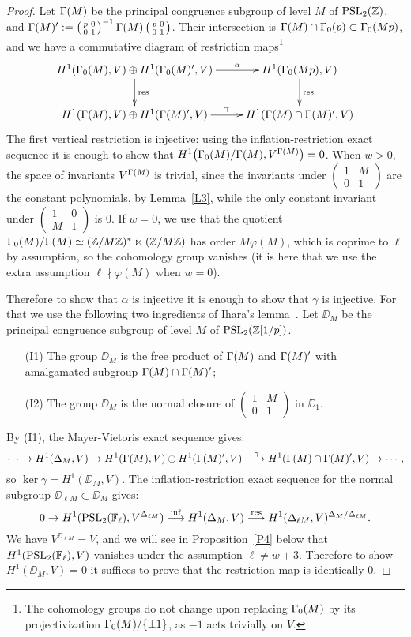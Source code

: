 \documentclass{amsart}
\theoremstyle{plain}
\theoremstyle{definition}
\numberwithin{equation}{section}
\newcommand{\Z}{{\mathbb Z}}
\def\a{\alpha}\def\b{\beta}\def\g{\gamma}
\def\sm#1#2#3#4{\left(\begin{smallmatrix}#1&#2 \\ #3 & #4 \end{smallmatrix}\right)}
\def\vp{\varphi}
\def\rar{\rightarrow}\def\FF{\mathbb{F}}
\begin{document}
\begin{proof}
Let $\Gamma(M)$ be the principal congruence subgroup of level $M$ of
$\PSL_2(\Z)$, and $\G(M)':=\sm p001 ^{-1}
\G(M) \sm p001$. Their intersection is $\Gamma(M)\cap \Gamma_0(p)\subset \Gamma_0(Mp)$, and 
we have a commutative diagram of restriction maps\footnote{The cohomology groups 
do not change upon replacing $\Gamma_0(M)$ by its projectivization 
$\Gamma_0(M)/ \{\pm 1\}$, as $-1$ acts trivially on $V.$}
\[\xymatrix{
H^1(\G_0(M), V)\oplus H^1(\G_0(M)', V) \ar[d]^{\res} \ar[r]^-{\a} & H^1(\G_0(Mp), V)
\ar[d]^{\res}\\
H^1(\G(M), V)\oplus H^1(\G(M)', V)\ar[r]^-{\g} & H^1(\G(M)\cap \G(M)',V) 
}\] 
The first vertical restriction is injective: using the inflation-restriction exact sequence
it is enough to show that $H^1\big(\Gamma_0(M)/\Gamma(M), V^{\Gamma(M)}\big)=0$.
When $w>0$, the space of invariants  $V^{\Gamma(M)}$ is trivial, since the invariants 
under $\sm 1M01$ are the constant polynomials, by Lemma~\ref{L3}, while the
only constant invariant under $\sm 10M1$ is 0. If $w=0$, we use that the quotient  
$\G_0(M)/\G(M)\simeq(\Z/M\Z)^*\ltimes(\Z/M\Z)$ has order $M\vp(M)$, which 
is coprime to $\ell$ by assumption, so the cohomology group vanishes (it is here
that we use the extra assumption $\ell\nmid \vp(M)$ when $w=0$). 

Therefore to show that $\a$ is injective it is enough to show that $\g$ is injective.
For that we use the following two ingredients of Ihara's lemma~\cite[Lemma 3.2]{Ih}. Let $\DD_M$ be the principal 
congruence subgroup of level $M$ of $\PSL_2(\Z[1/p])$.

\begin{enumerate}
   \item [(I1)] The group $\DD_M$ is the free product of $\Gamma(M)$ and $\Gamma(M)'$ with
amalgamated subgroup $\Gamma(M)\cap \Gamma(M)'$;
   \item [(I2)] The group $\DD_M$ is the normal closure of $\sm 1M01$ in $\DD_1$.     
\end{enumerate}

By (I1), the Mayer-Vietoris exact sequence gives:
\[
\cdots \rar H^1(\DD_M, V)\rar H^1(\G(M), V)\oplus
H^1(\G(M)', V)\ \stackrel{\g}{\longrightarrow} H^1(\G(M)\cap \G(M)',V)
\rar \cdots\,,
\]
so $\ker \g=H^1(\DD_M, V)$.
The inflation-restriction exact sequence for the normal 
subgroup $\DD_{\ell M}\subset \DD_M$ gives:
\[
0\rar H^1(\PSL_2(\FF_\ell), V^{\DD_{\ell
M}})\stackrel{\mathrm{inf}}{\longrightarrow} H^1(\DD_M, V)
\stackrel{\mathrm{res}}{\longrightarrow} H^1(\DD_{\ell M},
V)^{\DD_M/\DD_{\ell M}}.
\]
We have $V^{\DD_{\ell M}}=V$,
and we will see in Proposition~\ref{P4} below that 
$H^1(\PSL_2(\FF_\ell), V)$ vanishes under the assumption $\ell\ne w+3$. Therefore 
to show $H^1(\DD_M, V)=0$ it suffices to prove that the restriction map is 
identically 0. 


\end{proof}
\end{document}
